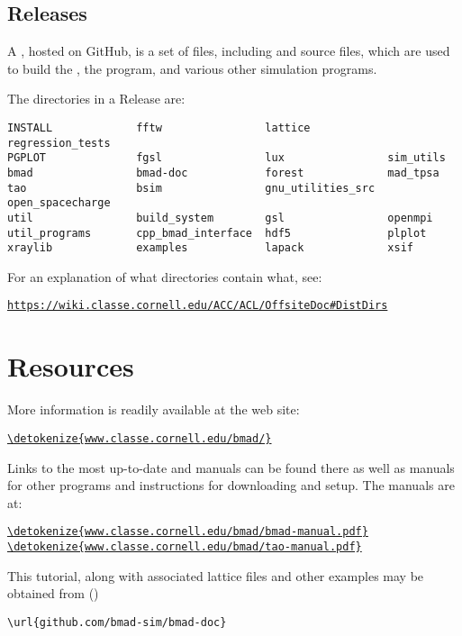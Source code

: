 \documentclass{hitec}     %
\newcommand{\Section}[1]{\section{#1}\vspace*{-1ex}}
\newenvironment{display}
  {\vspace*{-1.5ex} \begin{alltt}}
  {\end{alltt} \vspace*{-1.0ex}}
\begin{document}
\subsection{Releases}
\label{s:dist}

A , hosted on GitHub, is a set of files, including \bmad and \tao source files, which
are used to build the \bmad, the \tao program, and various other simulation programs.

The directories in a Release are:
\begin{lstlisting}[mathescape]
INSTALL             fftw                lattice            regression_tests
PGPLOT              fgsl                lux                sim_utils
bmad                bmad-doc            forest             mad_tpsa
tao                 bsim                gnu_utilities_src  open_spacecharge
util                build_system        gsl                openmpi
util_programs       cpp_bmad_interface  hdf5               plplot
xraylib             examples            lapack             xsif
\end{lstlisting}

For an explanation of what directories contain what, see:
\begin{display}
  \url{https://wiki.classe.cornell.edu/ACC/ACL/OffsiteDoc#DistDirs}
\end{display}

\newpage

\Section{Resources}
\label{s:resources}

More information is readily available at the \bmad web site:
\begin{display}
  \url{\detokenize{www.classe.cornell.edu/bmad/}}
\end{display}
Links to the most up-to-date \bmad and \tao manuals can be found there as well as manuals for other
programs and instructions for downloading and setup. The manuals are at:
\begin{display}
  \url{\detokenize{www.classe.cornell.edu/bmad/bmad-manual.pdf}}
  \url{\detokenize{www.classe.cornell.edu/bmad/tao-manual.pdf}}
\end{display}

This tutorial, along with associated lattice files and other examples may be obtained from 
()
\begin{lstlisting}[mathescape]
  \url{github.com/bmad-sim/bmad-doc}
\end{lstlisting}
\end{document}
